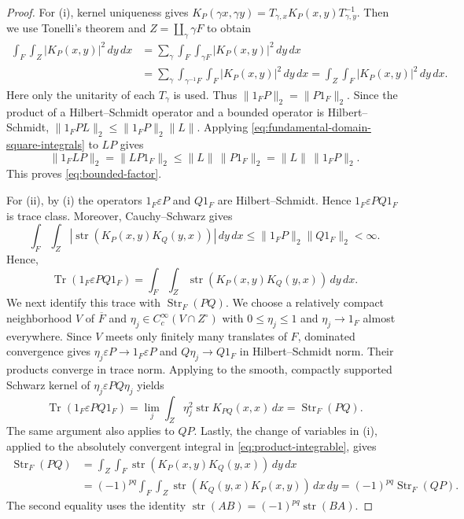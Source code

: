 \documentclass[12pt,reqno]{amsart}
\numberwithin{equation}{section}
\theoremstyle{definition}
\newcommand{\Str}{\operatorname{Str}}
\newcommand{\Tr}{\operatorname{Tr}}
\newcommand{\str}{\operatorname{str}}
\begin{document}
\begin{proof}
For \textup{(i)}, kernel uniqueness gives
$K_P(\gamma x,\gamma y)=T_{\gamma,x}K_P(x,y)T_{\gamma,y}^{-1}$.
Then we use Tonelli's theorem and  $Z=\coprod_\gamma\gamma F$ to obtain
\[
\begin{aligned}
 \int_F\!\int_Z|K_P(x,y)|^2\,dy\,dx
 &=\sum_\gamma\int_F\!\int_{\gamma F}|K_P(x,y)|^2\,dy\,dx\\
 &=\sum_\gamma\int_{\gamma^{-1}F}\!\int_F|K_P(x,y)|^2\,dy\,dx
 =\int_Z\!\int_F|K_P(x,y)|^2\,dy\,dx.
\end{aligned}
\]
Here only the unitarity of each $T_\gamma$ is used.
Thus $\|1_FP\|_2=\|P1_F\|_2$. Since the product of a Hilbert--Schmidt operator and a bounded
operator is Hilbert--Schmidt, $\|1_FPL\|_2\leq \|1_FP\|_2\|L\|$.
Applying \eqref{eq:fundamental-domain-square-integrals} to $LP$ gives
\[
 \|1_FLP\|_2=\|LP1_F\|_2
 \leq \|L\|\,\|P1_F\|_2
 =\|L\|\,\|1_FP\|_2.
\]
This proves \eqref{eq:bounded-factor}.

For \textup{(ii)}, by \textup{(i)} the operators
$1_F\varepsilon P$ and $Q1_F$ are Hilbert--Schmidt.  Hence
$1_F\varepsilon PQ1_F$ is trace class.  Moreover, Cauchy--Schwarz gives
\begin{equation}\label{eq:product-integrable}
 \int_F\!\int_Z
 |\str(K_P(x,y)K_Q(y,x))|\,dy\,dx
 \leq\|1_FP\|_2\|Q1_F\|_2<\infty.
\end{equation}
Hence,
\[
 \Tr(1_F\varepsilon PQ1_F)
 =\int_F\!\int_Z\str(K_P(x,y)K_Q(y,x))\,dy\,dx.
\]
We next identify this trace with $\Str_F(PQ)$. We choose a relatively
compact neighborhood $V$ of $\overline F$ and
$\eta_j\in C_c^\infty(V\cap Z^\circ)$ with
$0\leq\eta_j\leq1$ and $\eta_j\to1_F$ almost everywhere.
Since $V$ meets only finitely many translates of $F$, dominated
convergence gives $\eta_j\varepsilon P\to1_F\varepsilon P$ and
$Q\eta_j\to Q1_F$ in Hilbert--Schmidt norm.  Their products converge
in trace norm. Applying \cite[Proposition~2.44]{BGV} to the smooth,
compactly supported Schwarz kernel of $\eta_j\varepsilon PQ\eta_j$ yields
\[
 \Tr(1_F\varepsilon PQ1_F)
 =\lim_j\int_Z\eta_j^2\str K_{PQ}(x,x)\,dx
 =\Str_F(PQ).
\]
The same argument also applies to $QP$. Lastly, the change of variables in \textup{(i)}, applied to the absolutely
convergent integral in \eqref{eq:product-integrable}, gives
\[
\begin{aligned}
 \Str_F(PQ)
 &=\int_Z\!\int_F\str(K_P(x,y)K_Q(y,x))\,dy\,dx\\
 &=(-1)^{pq}\int_F\!\int_Z
       \str(K_Q(y,x)K_P(x,y))\,dx\,dy
 =(-1)^{pq}\Str_F(QP).
\end{aligned}
\]
The second equality uses the identity $\str(AB)=(-1)^{pq}\str(BA)$. 
\end{proof}
\end{document}
